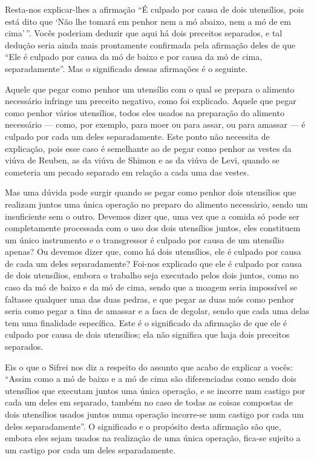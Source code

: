 Resta-nos explicar-lhes a afirmação ``É culpado por causa de dois
utensílios, pois está dito que `Não lhe tomará em penhor nem a mó
abaixo, nem a mó de em cima'\,''. Vocês poderiam deduzir que aqui há dois
preceitos separados, e tal dedução seria ainda mais prontamente
confirmada pela afirmação deles de que ``Ele é culpado por causa da mó
de baixo e por causa da mó de cima, separadamente''. Mas o significado
dessas afirmações é o seguinte.

Aquele que pegar como penhor um utensílio com o qual se prepara o
alimento necessário infringe um preceito negativo, como foi explicado.
Aquele que pegar como penhor vários utensílios, todos eles usados na
preparação do alimento necessário --- como, por exemplo, para moer ou
para assar, ou para amassar --- é culpado por cada um deles
separadamente. Este ponto não necessita de explicação, pois esse caso é
semelhante ao de pegar como penhor as vestes da viúva de Reuben, as da
viúva de Shimon e as da viúva de Levi, quando se cometeria um pecado
separado em relação a cada uma das vestes.

Mas uma dúvida pode surgir quando se pegar como penhor dois utensílios
que realizam juntos uma única operação no preparo do alimento
necessário, sendo um insuficiente sem o outro. Devemos dizer que, uma
vez que a comida só pode ser completamente processada com o uso dos
dois utensílios juntos, eles constituem um único instrumento e o
transgressor é culpado por causa de um utensílio apenas? Ou devemos
dizer que, como há dois utensílios, ele é culpado por causa de cada um
deles separadamente? Foi-nos explicado que ele é culpado por causa de
dois utensílios, embora o trabalho seja executado pelos dois juntos,
como no caso da mó de baixo e da mó de cima, sendo que a moagem seria
impossível se faltasse qualquer uma das duas pedras, e que pegar as
duas mós como penhor seria como pegar a tina de amassar e a faca de
degolar, sendo que cada uma delas tem uma finalidade específica. Este é
o significado da afirmação de que ele é culpado por causa de dois
utensílios; ela não significa que haja dois preceitos separados.

Eis o que o Sifrei nos diz a respeito do assunto que acabo de explicar
a vocês: ``Assim como a mó de baixo e a mó de cima são diferenciadas
como sendo dois utensílios que executam juntos uma única operação, e se
incorre num castigo por cada um deles em separado, também no caso de
todas as coisas compostas de dois utensílios usados juntos numa
operação incorre-se num castigo por cada um deles separadamente''. O
significado e o propósito desta afirmação são que, embora eles sejam
usados na realização de uma única operação, fica-se sujeito a um castigo
por cada um deles separadamente.

